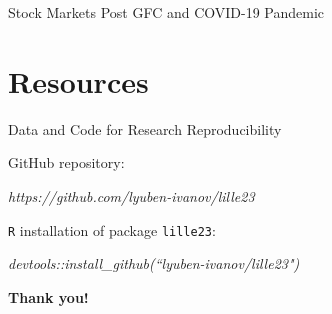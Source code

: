 \documentclass{beamer}
\begin{document}
\begin{frame}{Stock Markets Post GFC and COVID-19 Pandemic}

\begin{figure}[h!]
     \centering
     
\end{figure} 
	
\end{frame}

\section{Resources}

\begin{frame}{Data and Code for Research Reproducibility}

GitHub repository: 

\quad \quad \textit{https://github.com/lyuben-ivanov/lille23}

\vfill

\texttt{R} installation of package \texttt{lille23}:

\quad \quad \textit{devtools::install\_github(``lyuben-ivanov/lille23")}

\end{frame}



\begin{frame}
\centering \Huge \bfseries Thank you!	
\end{frame}
\end{document}
